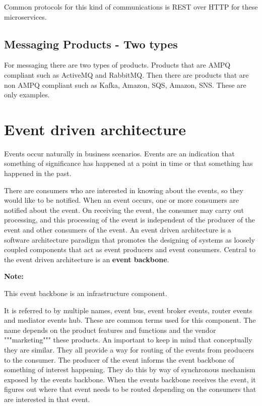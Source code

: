 \documentclass[a4paper, 11pt]{book}
\newenvironment{note}{
    \begin{siderule}
        \textbf{Note: }
        }{
    \end{siderule}
}
\begin{document}
    Common protocols for this kind of communications is REST over HTTP for these microservices.

    \subsection{Messaging Products - Two types}
    For messaging there are two types of products.
    Products that are AMPQ compliant such as ActiveMQ and RabbitMQ.
    Then there are products that are non AMPQ compliant such as Kafka, Amazon, SQS, Amazon, SNS. These are only examples.



    \section{Event driven architecture}
    Events occur naturally in business scenarios.
    Events are an indication that something of significance has happened at a point in time or that something has happened in the past.

    There are consumers who are interested in knowing about the events, so they would like to be notified.
    When an event occurs, one or more consumers are notified about the event.
    On receiving the event, the consumer may carry out processing, and this processing of the event is independent of the producer of the event and other consumers of the event.
    An event driven architecture is a software architecture paradigm that promotes the designing of systems as loosely coupled components that act as event producers and event consumers.
    Central to the event driven architecture is an \textbf{event backbone}.

    \begin{note}
        This event backbone is an infrastructure component.
    \end{note}

    It is referred to by multiple names, event bus, event broker events, router events and mediator events hub.
    These are common terms used for this component.
    The name depends on the product features and functions and the vendor """marketing""" these products.
    An important to keep in mind that conceptually they are similar.
    They all provide a way for routing of the events from producers to the consumer.
    The producer of the event informs the event backbone of something of interest happening.
    They do this by way of synchronous mechanism exposed by the events backbone.
    When the events backbone receives the event, it figures out where that event needs to be routed depending on the consumers that are interested in that event.
\end{document}
